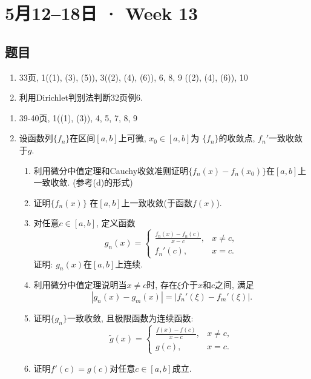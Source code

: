 \documentclass[UTF8,11pt, a4paper, oneside, fontset=none]{ctexbook}
\begin{document}
\clearpage

\section{5月12--18日 · Week 13}

\subsection*{题目}

\begin{enumerate}

\item 33页, 1((1), (3), (5)), 3((2), (4), (6)), 6, 8, 9 ((2), (4), (6)), 10  
 
\item 利用Dirichlet判别法判断32页例6.

\end{enumerate}

\begin{enumerate}

\item 39-40页, 1((1), (3)), 4, 5, 7, 8, 9  
 
\item 设函数列$\{ f_n \}$在区间$[a, b]$上可微, $x_0 \in [a, b]$为 $\{ f_n\}$的收敛点, $f_n'$一致收敛于$g$.

\begin{enumerate}
\item 利用微分中值定理和Cauchy收敛准则证明$\{f_n(x) - f_n(x_0) \}$在$[a, b]$上一致收敛. (参考(d)的形式)

\item 证明$\{f_n(x) \}$ 在$[a, b]$上一致收敛(于函数$f(x)$).

\item 对任意$c \in [a, b]$, 定义函数
\[
g_n(x) = \begin{cases}
\frac{f_n(x) - f_n(c)}{x - c}, & x \neq c,\\
f_n'(c), & x = c.
\end{cases}
\]
证明: $g_n(x)$在$[a, b]$上连续.

\item 利用微分中值定理说明当$x \neq c$时, 存在$\xi$介于$x$和$c$之间, 满足
\[
|g_n(x) - g_m(x)| = | f_n'(\xi) - f_m'(\xi) |.
\]

\item 证明$\{ g_n \}$一致收敛, 且极限函数为连续函数:
\[
\tilde g(x) = \begin{cases}
\frac{f(x) - f(c)}{x - c}, & x \neq c,\\
g(c), & x = c.
\end{cases}
\]

\item 证明$f'(c) = g(c)$对任意$c \in [a, b]$成立.

\end{enumerate}

\end{enumerate}
\end{document}
